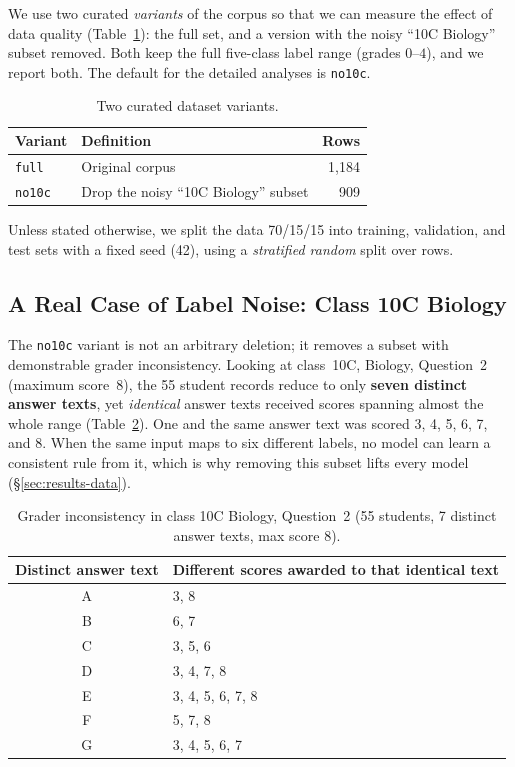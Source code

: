 We use two curated \emph{variants} of the corpus so that we can measure the effect of data quality
(Table~\ref{tab:variants}): the full set, and a version with the noisy ``10C Biology'' subset removed.
Both keep the full five-class label range (grades $0$--$4$), and we report both. The default for the
detailed analyses is \texttt{no10c}.

\begin{table}[t]
\centering
\caption{Two curated dataset variants.}
\label{tab:variants}
\begin{tabular}{@{}llr@{}}
\toprule
Variant & Definition & Rows \\
\midrule
\texttt{full}        & Original corpus                                  & 1{,}184 \\
\texttt{no10c}       & Drop the noisy ``10C Biology'' subset            & 909 \\
\bottomrule
\end{tabular}
\end{table}

Unless stated otherwise, we split the data 70/15/15 into training, validation, and test sets with a
fixed seed (42), using a \emph{stratified random} split over rows.

\subsection{A Real Case of Label Noise: Class 10C Biology}
\label{sec:noisy}
The \texttt{no10c} variant is not an arbitrary deletion; it removes a subset with demonstrable grader
inconsistency. Looking at class~10C, Biology, Question~2 (maximum score~8), the 55 student records
reduce to only \textbf{seven distinct answer texts}, yet \emph{identical} answer texts received scores
spanning almost the whole range (Table~\ref{tab:noise10c}). One and the same answer text was scored 3,
4, 5, 6, 7, and 8. When the same input maps to six different labels, no model can learn a consistent
rule from it, which is why removing this subset lifts every model (\S\ref{sec:results-data}).

\begin{table}[t]
\centering
\caption[Grader inconsistency in class 10C Biology, Question~2]{Grader inconsistency in class 10C Biology, Question~2 (55 students, 7 distinct answer
texts, max score 8).}
\label{tab:noise10c}
\small
\begin{tabular}{@{}cl@{}}
\toprule
Distinct answer text & Different scores awarded to that identical text \\
\midrule
A & 3, 8 \\
B & 6, 7 \\
C & 3, 5, 6 \\
D & 3, 4, 7, 8 \\
E & 3, 4, 5, 6, 7, 8 \\
F & 5, 7, 8 \\
G & 3, 4, 5, 6, 7 \\
\bottomrule
\end{tabular}
\end{table}

